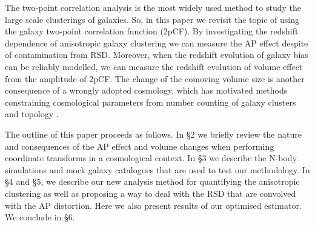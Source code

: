 \documentclass[useAMS,usenatbib]{mn2e}
\begin{document}
The two-point correlation analysis is the most widely used method to study the large scale clusterings of galaxies.
So, in this paper we revisit the topic of \cite{Li2014} using the galaxy two-point correlation function (2pCF).
By investigating the redshift dependence of anisotropic galaxy clustering we can measure the AP effect despite of contamination from RSD.
Moreover, when the redshift evolution of galaxy bias can be reliably modelled,
we can measure the redshift evolution of volume effect from the amplitude of 2pCF.
The change of the comoving volume size is another consequence of a wrongly adopted cosmology,
which has motivated methods constraining cosmological parameters from number counting of 
galaxy clusters \citep{PS1974,VL1996} and topology \citep{topology}.


The outline of this paper proceeds as follows. 
In \S 2 we briefly review the nature and consequences of the AP effect and volume changes when performing coordinate transforms in a cosmological context. 
In \S 3 we describe the N-body simulations and mock galaxy catalogues that are used to test our methodology.
In \S 4 and \S 5, we describe our new analysis method for quantifying the anisotropic clustering as well as proposing a way to deal with the RSD that are convolved with the AP distortion. 
Here we also present results of our optimised estimator. 
We conclude in \S 6.


\end{document}

